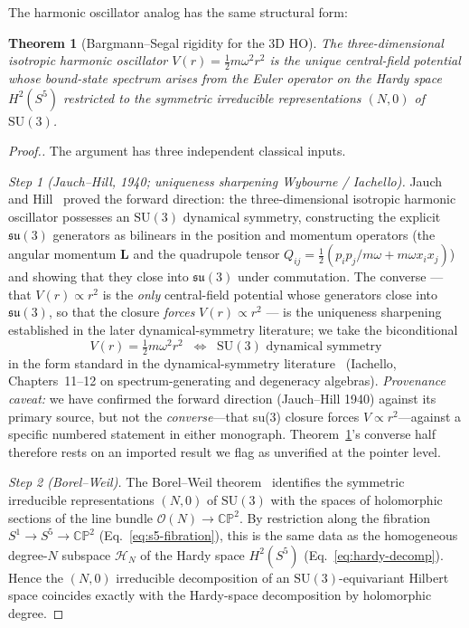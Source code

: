 \documentclass[twocolumn,pra,amsmath,amssymb,superscriptaddress]{revtex4-2}
\newtheorem{theorem}{Theorem}
\begin{document}
The harmonic oscillator analog has the same structural form:

\begin{theorem}[Bargmann--Segal rigidity for the 3D HO]
\label{thm:rigidity}
The three-dimensional isotropic harmonic oscillator $V(r) =
\frac{1}{2} m \omega^2 r^2$ is the unique central-field
potential whose bound-state spectrum arises from the Euler
operator on the Hardy space $H^2(S^5)$ restricted to the
symmetric irreducible representations $(N, 0)$ of $\mathrm{SU}(3)$.
\end{theorem}

\begin{proof}[Proof.]
The argument has three independent classical inputs.

\emph{Step 1 (Jauch--Hill, 1940; uniqueness sharpening
Wybourne / Iachello).}  Jauch and Hill~\cite{jauchhill1940}
proved the forward direction: the three-dimensional isotropic
harmonic oscillator possesses an $\mathrm{SU}(3)$ dynamical
symmetry, constructing the explicit $\mathfrak{su}(3)$ generators
as bilinears in the position and momentum operators (the angular
momentum $\mathbf{L}$ and the quadrupole tensor
$Q_{ij} = \frac{1}{2}(p_i p_j / m\omega + m\omega x_i x_j)$) and
showing that they close into $\mathfrak{su}(3)$ under commutation.
The converse --- that $V(r) \propto r^2$ is the \emph{only}
central-field potential whose generators close into
$\mathfrak{su}(3)$, so that the closure \emph{forces}
$V(r) \propto r^2$ --- is the uniqueness sharpening established in
the later dynamical-symmetry literature; we take the biconditional
\[
  V(r) = \tfrac{1}{2} m\omega^2 r^2
  \;\;\Longleftrightarrow\;\;
  \mathrm{SU}(3)\text{ dynamical symmetry}
\]
in the form standard in the dynamical-symmetry literature~\cite{wybourne1974,iachello2006}
(Iachello, Chapters~11--12 on spectrum-generating and degeneracy algebras).
\emph{Provenance caveat:} we have confirmed the forward direction (Jauch--Hill
1940) against its primary source, but not the \emph{converse}---that su(3)
closure forces $V \propto r^{2}$---against a specific numbered statement in
either monograph.  Theorem~\ref{thm:rigidity}'s converse half therefore rests on
an imported result we flag as unverified at the pointer level.

\emph{Step 2 (Borel--Weil).}  The Borel--Weil
theorem~\cite{borelweil} identifies the symmetric irreducible
representations $(N, 0)$ of $\mathrm{SU}(3)$ with the spaces of
holomorphic sections of the line bundle $\mathcal{O}(N) \to
\mathbb{CP}^2$.  By restriction along the fibration $S^1 \to S^5
\to \mathbb{CP}^2$ (Eq.~\eqref{eq:s5-fibration}), this is the
same data as the homogeneous degree-$N$ subspace
$\mathcal{H}_N$ of the Hardy space $H^2(S^5)$
(Eq.~\eqref{eq:hardy-decomp}).  Hence the $(N, 0)$ irreducible
decomposition of an $\mathrm{SU}(3)$-equivariant Hilbert space
coincides exactly with the Hardy-space decomposition by
holomorphic degree.


\end{proof}
\end{document}
